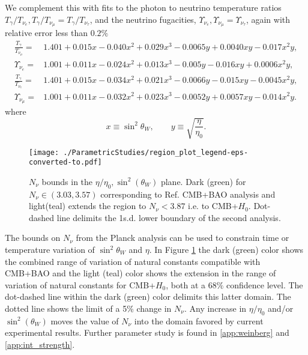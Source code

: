 We complement this with fits to the photon to neutrino temperature ratios $ T_\gamma / T_{\nu_e}, T_\gamma / T_{\nu_\mu}= T_\gamma / T_{\nu_\tau} $, and the neutrino fugacities, $\Upsilon_{\nu_e}, \Upsilon_{\nu_\mu}=\Upsilon_{\nu_\tau}$, again with relative error less than $0.2\%$  
\begin{align}
\frac{T_\gamma}{T_{\nu_\mu}}=&1.401+0.015x-0.040x^2+0.029x^3-0.0065y+0.0040xy-0.017x^2y, \label{fit1}\\
\Upsilon_{\nu_e}=&1.001+0.011x-0.024x^2+0.013x^3-0.005y-0.016xy+0.0006x^2y,\label{fit2}\\ 
\frac{T_\gamma}{T_{\nu_e}}=&1.401+0.015x-0.034x^2+0.021x^3-0.0066y-0.015xy-0.0045x^2y,\label{fit3}\\
\Upsilon_{\nu_\mu}=&1.001+0.011x-0.032x^2+0.023x^3-0.0052y+0.0057xy-0.014x^2y.\label{fit4}
\end{align}
where
\begin{equation}%
x\equiv \sin^2 \theta_W ,\qquad
y\equiv  \sqrt{\frac{\eta}{\eta_0}}.
\end{equation}%

\begin{figure}%
\centerline{\texttt{[image: ./ParametricStudies/region\_plot\_legend-eps-converted-to.pdf]}
}
\caption{$N_\nu$ bounds in the $\eta/\eta_0, \sin^2(\theta_W)$ plane. Dark (green) for $N_\nu\in (3.03,3.57)$ corresponding to Ref.\cite{Planck} CMB+BAO analysis and light(teal) extends the region to $N_\nu<3.87$ i.e. to CMB+$H_0$. Dot-dashed line delimits the 1s.d. lower boundary of the second analysis.}
\label{N_nu_domain}
 \end{figure}
The bounds on $N_\nu$ from the Planck analysis \cite{Planck} can be  used to constrain time or temperature variation of $\sin^2\theta_W$ and $\eta$.  
In  Figure \ref{N_nu_domain} the dark (green) color shows the combined range of  variation of natural constants  compatible with CMB+BAO and the light (teal) color shows  the extension in the range of  variation of  natural constants for CMB+$H_0$, both at a $68\%$ confidence level. The dot-dashed line within the dark (green) color  delimits   this latter domain. The dotted line shows the limit of a 5\% change in $N_\nu$.    Any increase in  $\eta/\eta_0$ and/or $\sin^2(\theta_W)$ moves the value of $N_\nu$ into the domain favored by current experimental results. Further parameter study is found in \ref{app:weinberg} and \ref{app:int_strength}.


